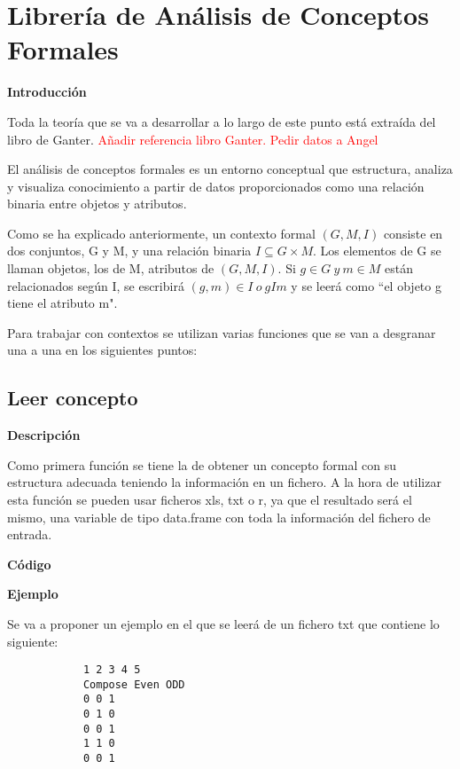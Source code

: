 \section{Librer\'ia de An\'alisis de Conceptos Formales}

\textbf{Introducci\'on}

Toda la teor\'ia que se va a desarrollar a lo largo de este punto est\'a extra\'ida del libro de Ganter.
\textcolor{red}{A\~nadir referencia libro Ganter. Pedir datos a Angel}

El an\'alisis de conceptos formales es un entorno conceptual que estructura, analiza y visualiza conocimiento a partir de datos proporcionados 
como una relaci\'on binaria entre objetos y atributos.

Como se ha explicado anteriormente, un contexto formal \( (G, M, I) \) consiste en dos conjuntos, G y M, y una relaci\'on binaria \( I \subseteq G \times M \). Los elementos 
de G se llaman objetos, los de M, atributos de \( (G, M, I) \). Si \(g \in G ~ y ~ m \in M \) est\'an relacionados seg\'un I, se escribir\'a 
\( (g,m) \in I ~ o ~ g I m \) y se leer\'a como ``el objeto g tiene el atributo m".

Para trabajar con contextos se utilizan varias funciones que se van a desgranar una a una en los siguientes puntos:

    \subsection{Leer concepto}

        \textbf{Descripci\'on}

        Como primera funci\'on se tiene la de obtener un concepto formal con su estructura adecuada teniendo la informaci\'on en un fichero. A la 
        hora de utilizar esta funci\'on se pueden usar ficheros xls, txt o r, ya que el resultado ser\'a el mismo, una variable de tipo data.frame 
        con toda la informaci\'on del fichero de entrada.
        \\

        \clearpage

        \textbf{C\'odigo}

        
        \bigskip

        \textbf{Ejemplo}

        Se va a proponer un ejemplo en el que se leer\'a de un fichero txt que contiene lo siguiente:

        \begin{verbatim}
            1 2 3 4 5
            Compose Even ODD
            0 0 1
            0 1 0
            0 0 1
            1 1 0
            0 0 1
        \end{verbatim}

